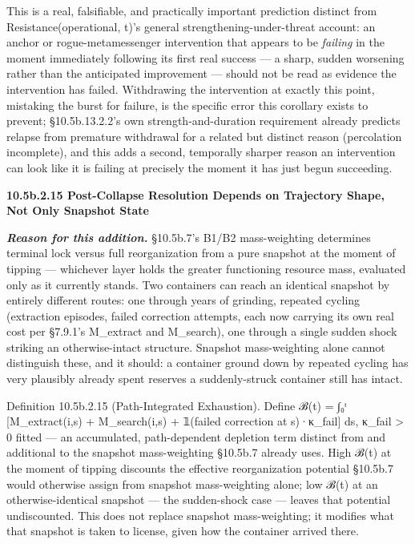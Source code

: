 \documentclass[
]{article}
\begin{document}
This is a real, falsifiable, and practically important prediction
distinct from Resistance(operational, t)'s general
strengthening-under-threat account: an anchor or rogue-metamessenger
intervention that appears to be \emph{failing} in the moment immediately
following its first real success --- a sharp, sudden worsening rather
than the anticipated improvement --- should not be read as evidence the
intervention has failed. Withdrawing the intervention at exactly this
point, mistaking the burst for failure, is the specific error this
corollary exists to prevent; §10.5b.13.2.2's own strength-and-duration
requirement already predicts relapse from premature withdrawal for a
related but distinct reason (percolation incomplete), and this adds a
second, temporally sharper reason an intervention can look like it is
failing at precisely the moment it has just begun succeeding.

\textbf{10.5b.2.15 Post-Collapse Resolution Depends on Trajectory Shape,
Not Only Snapshot State}

\emph{\textbf{Reason for this addition.}} §10.5b.7's B1/B2
mass-weighting determines terminal lock versus full reorganization from
a pure snapshot at the moment of tipping --- whichever layer holds the
greater functioning resource mass, evaluated only as it currently
stands. Two containers can reach an identical snapshot by entirely
different routes: one through years of grinding, repeated cycling
(extraction episodes, failed correction attempts, each now carrying its
own real cost per §7.9.1's M\_extract and M\_search), one through a
single sudden shock striking an otherwise-intact structure. Snapshot
mass-weighting alone cannot distinguish these, and it should: a
container ground down by repeated cycling has very plausibly already
spent reserves a suddenly-struck container still has intact.

Definition 10.5b.2.15 (Path-Integrated Exhaustion). Define ℬ(t) = ∫₀ᵗ
{[}M\_extract(i,s) + M\_search(i,s) + 𝟙(failed correction at
s)·κ\_fail{]} ds, κ\_fail \textgreater{} 0 fitted --- an accumulated,
path-dependent depletion term distinct from and additional to the
snapshot mass-weighting §10.5b.7 already uses. High ℬ(t) at the moment
of tipping discounts the effective reorganization potential §10.5b.7
would otherwise assign from snapshot mass-weighting alone; low ℬ(t) at
an otherwise-identical snapshot --- the sudden-shock case --- leaves
that potential undiscounted. This does not replace snapshot
mass-weighting; it modifies what that snapshot is taken to license,
given how the container arrived there.
\end{document}
